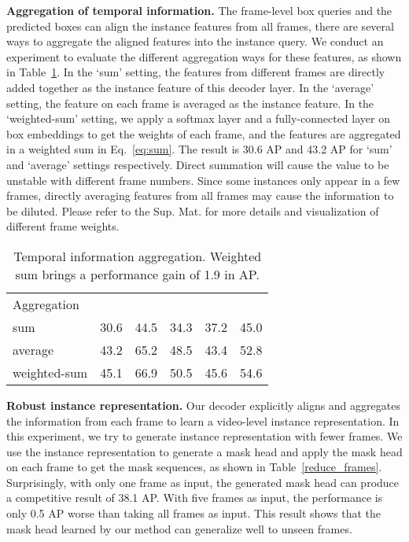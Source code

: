 \documentclass[runningheads]{llncs}
\begin{document}
\noindent\textbf{Aggregation of temporal information.}
The frame-level box queries and the predicted boxes can align the instance features from all frames, there are several ways to aggregate the aligned features into the instance query.
We conduct an experiment to evaluate the different aggregation ways for these features, as shown in Table~\ref{ablation_combinations}.
In the ‘sum' setting, the features from different frames are directly added together as the instance feature of this decoder layer. In the ‘average' setting, the feature on each frame is averaged as the instance feature. In the ‘weighted-sum' setting, we apply a softmax layer and a fully-connected layer on box embeddings to get the weights of each frame, and the features are aggregated in a weighted sum in Eq.~\ref{eq:sum}. 
The result is 30.6 AP and 43.2 AP for `sum' and `average' settings respectively. Direct summation will cause the value to be unstable with different frame numbers. Since some instances only appear in a few frames, directly averaging features from all frames may cause the information to be diluted. Please refer to the Sup. Mat. for more details and visualization of different frame weights. 


\setlength{\tabcolsep}{4pt}
\begin{table}[tb]
\begin{center}
\caption{Temporal information aggregation. Weighted sum brings a performance gain of 1.9 in AP.}
\label{ablation_combinations}
\begin{tabular}{lccccc}
\hline\noalign{\smallskip}
Aggregation    &    &  & &  &  \\
\noalign{\smallskip}
\hline
\noalign{\smallskip}
sum   &30.6  &44.5  &34.3  &37.2  &45.0 \\
average   &43.2  &65.2  &48.5  &43.4  &52.8 \\
weighted-sum   &45.1 &66.9 &50.5 &45.6 &54.6\\
\hline
\end{tabular}
\end{center}
\end{table}
\setlength{\tabcolsep}{1.4pt}




\noindent\textbf{Robust instance representation.}
Our decoder explicitly aligns and aggregates the information from each frame to learn a video-level instance representation.
In this experiment, we try to generate instance representation with fewer frames. We use the instance representation to generate a mask head and apply the mask head on each frame to get the mask sequences, as shown in Table~\ref{reduce_frames}. Surprisingly, with only one frame as input, the generated mask head can produce a competitive result of 38.1 AP. With five frames as input, the performance is only 0.5 AP worse than taking all frames as input. This result shows that the mask head learned by our method can generalize well to unseen frames.
\end{document}
